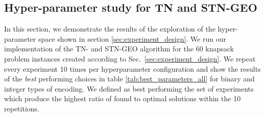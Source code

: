 \subsection{Hyper-parameter study for TN and STN-GEO} 

In this section, we demonstrate the results of the exploration of the hyper-parameter space shown in section \ref{sec:experiment_design}. We run our implementation of the TN- and STN-GEO algorithm for the 60 knapsack problem instances created according to Sec.~\ref{sec:experiment_design}. We repeat every experiment 10 times per hyperparameter configuration and show the results of the \emph{best} performing choices in table \ref{tab:best_parameters_all} for binary and integer types of encoding. We defined as best performing the set of experiments which produce the highest ratio of found to optimal solutions within the 10 repetitions.

